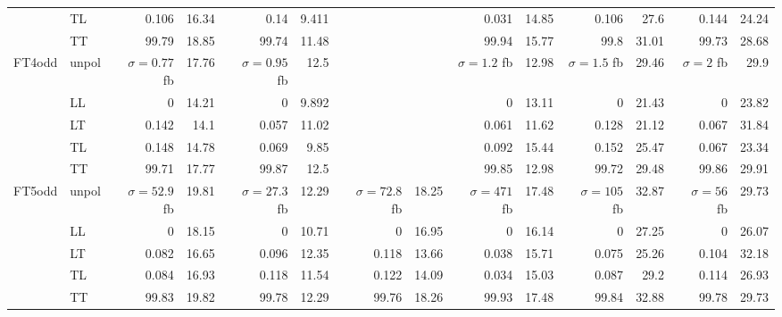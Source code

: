\begin{table}[h]
{\begin{tabular}{llrrrrrrrrrrrr}
 & TL & \num{0.106} & \num{16.34} & \num{0.14} & \num{9.411} &  &  & \num{0.031} & \num{14.85} & \num{0.106} & \num{27.6} & \num{0.144} & \num{24.24} \\
 & TT & \num{99.79} & \num{18.85} & \num{99.74} & \num{11.48} &  &  & \num{99.94} & \num{15.77} & \num{99.8} & \num{31.01} & \num{99.73} & \num{28.68} \\
\midrule
\multirow{5}{*}{FT4odd}
 & unpol & $\sigma = \num{0.77}$ fb & \num{17.76} & $\sigma = \num{0.95}$ fb & \num{12.5} &  &  & $\sigma = \num{1.2}$ fb & \num{12.98} & $\sigma = \num{1.5}$ fb & \num{29.46} & $\sigma = \num{2}$ fb & \num{29.9} \\
 & LL & \num{0} & \num{14.21} & \num{0} & \num{9.892} &  &  & \num{0} & \num{13.11} & \num{0} & \num{21.43} & \num{0} & \num{23.82} \\
 & LT & \num{0.142} & \num{14.1} & \num{0.057} & \num{11.02} &  &  & \num{0.061} & \num{11.62} & \num{0.128} & \num{21.12} & \num{0.067} & \num{31.84} \\
 & TL & \num{0.148} & \num{14.78} & \num{0.069} & \num{9.85} &  &  & \num{0.092} & \num{15.44} & \num{0.152} & \num{25.47} & \num{0.067} & \num{23.34} \\
 & TT & \num{99.71} & \num{17.77} & \num{99.87} & \num{12.5} &  &  & \num{99.85} & \num{12.98} & \num{99.72} & \num{29.48} & \num{99.86} & \num{29.91} \\
\midrule
\multirow{5}{*}{FT5odd}
 & unpol & $\sigma = \num{52.9}$ fb & \num{19.81} & $\sigma = \num{27.3}$ fb & \num{12.29} & $\sigma = \num{72.8}$ fb & \num{18.25} & $\sigma = \num{471}$ fb & \num{17.48} & $\sigma = \num{105}$ fb & \num{32.87} & $\sigma = \num{56}$ fb & \num{29.73} \\
 & LL & \num{0} & \num{18.15} & \num{0} & \num{10.71} & \num{0} & \num{16.95} & \num{0} & \num{16.14} & \num{0} & \num{27.25} & \num{0} & \num{26.07} \\
 & LT & \num{0.082} & \num{16.65} & \num{0.096} & \num{12.35} & \num{0.118} & \num{13.66} & \num{0.038} & \num{15.71} & \num{0.075} & \num{25.26} & \num{0.104} & \num{32.18} \\
 & TL & \num{0.084} & \num{16.93} & \num{0.118} & \num{11.54} & \num{0.122} & \num{14.09} & \num{0.034} & \num{15.03} & \num{0.087} & \num{29.2} & \num{0.114} & \num{26.93} \\
 & TT & \num{99.83} & \num{19.82} & \num{99.78} & \num{12.29} & \num{99.76} & \num{18.26} & \num{99.93} & \num{17.48} & \num{99.84} & \num{32.88} & \num{99.78} & \num{29.73} \\

\end{tabular}}
\end{table}
